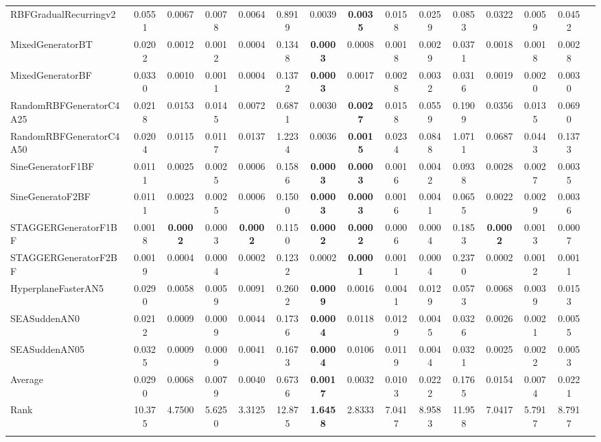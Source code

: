 \documentclass[reqno]{vcuthesis}
\numberwithin{equation}{chapter}
\begin{document}
\begin{table}[b!]
{\begin{tabularx}{1.45\textwidth}{l@{\extracolsep{\fill}}cccccccccccccc}
RBFGradualRecurringv2 &0.0551 &0.0067 &0.0078 &0.0064 &0.8919 &0.0039 &\textbf{0.0035} &0.0158 &0.0259 &0.0853 &0.0322 &0.0059 &0.0452 &  \\
MixedGeneratorBT &0.0202 &0.0012 &0.0012 &0.0004 &0.1348 &\textbf{0.0003} &0.0008 &0.0018 &0.0029 &0.0371 &0.0018 &0.0018 &0.0028 &  \\
MixedGeneratorBF &0.0330 &0.0010 &0.0011 &0.0004 &0.1372 &\textbf{0.0003} &0.0017 &0.0028 &0.0032 &0.0316 &0.0019 &0.0020 &0.0030 &  \\
RandomRBFGeneratorC4A25 &0.0218 &0.0153 &0.0145 &0.0072 &0.6871 &0.0030 &\textbf{0.0027} &0.0158 &0.0559 &0.1909 &0.0356 &0.0135 &0.0690 &  \\
RandomRBFGeneratorC4A50 &0.0204 &0.0115 &0.0117 &0.0137 &1.2234 &0.0036 &\textbf{0.0015} &0.0234 &0.0848 &1.0711 &0.0687 &0.0443 &0.1373 &  \\
SineGeneratorF1BF &0.0111 &0.0025 &0.0025 &0.0006 &0.1586 &\textbf{0.0003} &\textbf{0.0003} &0.0016 &0.0042 &0.0938 &0.0028 &0.0027 &0.0035 &  \\
SineGeneratoF2BF &0.0111 &0.0023 &0.0025 &0.0006 &0.1500 &\textbf{0.0003} &\textbf{0.0003} &0.0016 &0.0041 &0.0655 &0.0022 &0.0029 &0.0036 &  \\
STAGGERGeneratorF1BF &0.0018 &\textbf{0.0002} &0.0003 &\textbf{0.0002} &0.1150 &\textbf{0.0002} &\textbf{0.0002} &0.0006 &0.0004 &0.1853 &\textbf{0.0002} &0.0013 &0.0007 &  \\
STAGGERGeneratorF2BF &0.0019 &0.0004 &0.0004 &0.0002 &0.1232 &0.0002 &\textbf{0.0001} &0.0011 &0.0004 &0.2370 &0.0002 &0.0012 &0.0011 &  \\
HyperplaneFasterAN5 &0.0290 &0.0058 &0.0059 &0.0091 &0.2602 &\textbf{0.0009} &0.0016 &0.0041 &0.0129 &0.0573 &0.0068 &0.0039 &0.0153 &  \\
SEASuddenAN0 &0.0212 &0.0009 &0.0009 &0.0044 &0.1736 &\textbf{0.0004} &0.0118 &0.0129 &0.0045 &0.0326 &0.0026 &0.0021 &0.0055 &  \\
SEASuddenAN05 &0.0325 &0.0009 &0.0009 &0.0041 &0.1673 &\textbf{0.0004} &0.0106 &0.0119 &0.0044 &0.0321 &0.0025 &0.0022 &0.0053 &  \\
\noalign{\smallskip}\hline\noalign{\smallskip}
Average &0.0290 &0.0068 &0.0079 &0.0040 &0.6736 &\textbf{0.0017} &0.0032 &0.0103 &0.0222 &0.1765 &0.0154 &0.0074 &0.0221 &  \\
Rank &10.375 &4.7500 &5.6250 &3.3125 &12.875 &\textbf{1.6458} &2.8333 &7.0417 &8.9583 &11.958 &7.0417 &5.7917 &8.7917 &  \\
\noalign{\smallskip}\hline\noalign{\smallskip}
\end{tabularx}}
\begin{minipage}{0.9\textwidth}
\centering
{}
\end{minipage}
\end{table}
\end{document}
